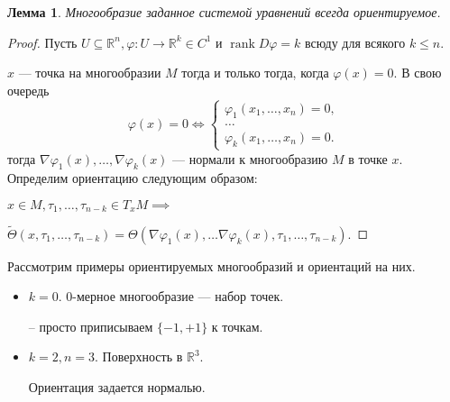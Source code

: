 \documentclass[a5paper]{article}
\newcounter{through}
\theoremstyle{plain}
\newtheorem{lemma}[through]{Лемма}
\theoremstyle{definition}
\numberwithin{through}{section}
\numberwithin{equation}{section}
\DeclareMathOperator{\rank}{rank}
\begin{document}
\begin{lemma}
	Многообразие заданное системой уравнений всегда ориентируемое.
\end{lemma}

\begin{proof}
Пусть $U \subseteq \mathbb{R}^n, \varphi: U \to \mathbb{R}^k \in C^1$ и $\rank D\varphi = k$ всюду для всякого $k \leq n$. 


$x$ --- точка на многообразии $M$ тогда и только тогда, когда $\varphi(x) = 0$. 
В свою очередь 
\begin{equation*}
	\varphi(x) = 0 \iff
	\begin{cases}
	\varphi_1(x_1,\ldots,x_n) = 0, \\
	\ldots \\
	\varphi_k(x_1,\ldots, x_n) = 0.
	\end{cases}
\end{equation*}	
тогда $\nabla \varphi_1(x),\ldots,\nabla \varphi_k(x)$ --- нормали к
многообразию $M$ в точке $x$.
Определим ориентацию следующим образом:

$x \in M, \tau_1,\ldots,\tau_{n-k} \in T_x M \implies $

$\tilde{\Theta}(x,\tau_1,\ldots,\tau_{n-k}) = \Theta(\nabla\varphi_1(x),\ldots
\nabla\varphi_k(x),\tau_1,\ldots,\tau_{n-k}).$
\end{proof}

Рассмотрим примеры ориентируемых многообразий и ориентаций на них.

\begin{itemize}
	\item
	$k = 0$. $0$-мерное многообразие --- набор точек.
	\begin{center}

	\end{center}
-- просто приписываем $\{-1,+1\}$ к точкам.

\item
$k = 2, n = 3$. Поверхность в $\mathbb{R}^3$.

Ориентация задается нормалью. 
\end{itemize}
\end{document}
